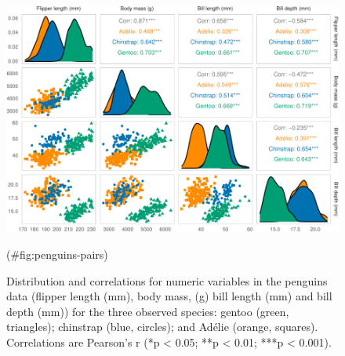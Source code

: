 \begin{Schunk}
\begin{figure}
\includegraphics{penguins_files/figure-latex/penguins-pairs-1} \caption[Distribution and correlations for numeric variables in the penguins data (flipper length (mm), body mass, (g) bill length (mm) and bill depth (mm)) for the three observed species]{Distribution and correlations for numeric variables in the penguins data (flipper length (mm), body mass, (g) bill length (mm) and bill depth (mm)) for the three observed species: gentoo (green, triangles); chinstrap (blue, circles); and Adélie (orange, squares). Correlations are Pearson's r (*p < 0.05; **p < 0.01; ***p < 0.001).}(\#fig:penguins-pairs)
\end{figure}
\end{Schunk}

